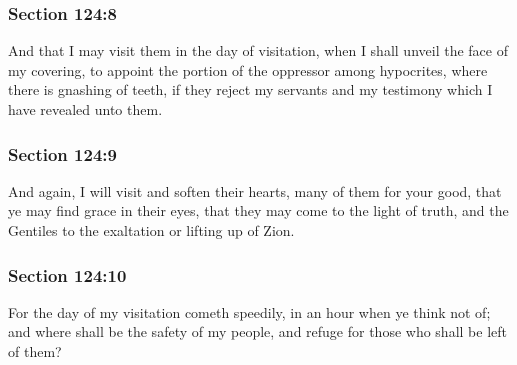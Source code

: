 	\subsubsection{Section 124:8} %
		\label{DC124-8}

		And that I may visit them in the day of visitation, when I shall unveil the face of my covering, to appoint the portion of the oppressor among hypocrites, where there is gnashing of teeth, if they reject my servants and my testimony which I have revealed unto them.


	\subsubsection{Section 124:9} %
		\label{DC124-9}

		And again, I will visit and soften their hearts, many of them for your good, that ye may find grace in their eyes, that they may come to the light of truth, and the Gentiles to the exaltation or lifting up of Zion.


	\subsubsection{Section 124:10} %
		\label{DC124-10}

		For the day of my visitation cometh speedily, in an hour when ye think not of; and where shall be the safety of my people, and refuge for those who shall be left of them?


